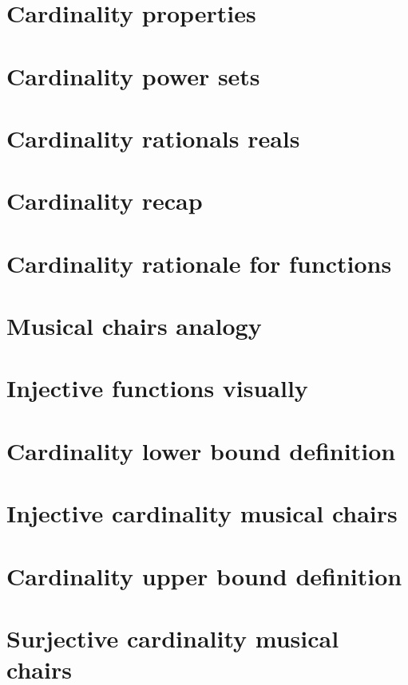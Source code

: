 
\section*{Cardinality properties}

\vfill
\section*{Cardinality power sets}

\vfill
\section*{Cardinality rationals reals}

\vfill
\section*{Cardinality recap}

\vfill
\section*{Cardinality rationale for functions}

\vfill
\section*{Musical chairs analogy}

\vfill
\section*{Injective functions visually}

\vfill
\section*{Cardinality lower bound definition}

\vfill
\section*{Injective cardinality musical chairs}

\vfill
\section*{Cardinality upper bound definition}

\vfill
\section*{Surjective cardinality musical chairs}

\vfill
